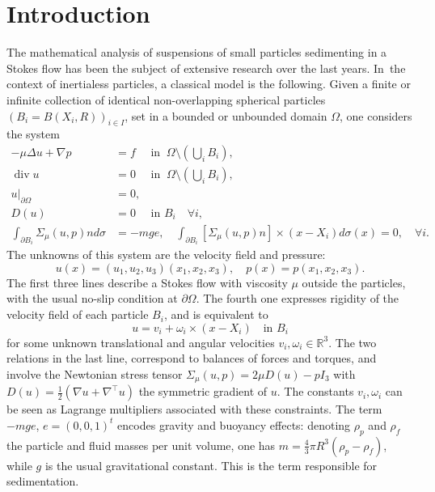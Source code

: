 \documentclass[JEP,XML,SOM,Unicode,NoEqCountersInSection,published]{cedram}
\let\ts\textstyle
\renewcommand{\div}{\operatorname{div}}
\theoremstyle{plain}
\theoremstyle{definition}
\let\pa\partial
\let\na\nabla
\newcommand{\R}{\mathbb{R}}
\begin{document}
\maketitle

\tableofcontents
\mainmatter

\section{Introduction}
The mathematical analysis of suspensions of small particles sedimenting in a Stokes flow has been the subject of extensive research over the last years. In~the context of inertialess particles, a classical model is the following. Given a finite or infinite collection of identical non-overlapping spherical particles $(B_i = B(X_i,R))_{i \in I}$, set in a bounded or unbounded domain $\Omega$, one considers the system
\begin{equation} \label{stokes_equation}
\begin{aligned}
-\mu \Delta u + \na p & = f \quad \text{ in } \: \Omega \setminus(\ts\bigcup_i B_i), \\
\div u & = 0 \quad \text{ in } \: \Omega \setminus(\ts\bigcup_i B_i), \\
u\vert_{\pa \Omega} & = 0, \\
D(u) & = 0 \quad \text{ in } B_i \quad \forall i, \\
\int_{\pa B_i} \Sigma_\mu(u,p) n d \sigma & = -m g e, \quad \int_{\pa B_i} [\Sigma_\mu(u,p) n] \times (x-X_i) d \sigma(x) = 0, \quad \forall i.
\end{aligned}
\end{equation}
The unknowns of this system are the velocity field and pressure:
\[
u(x) = (u_1,u_2,u_3)(x_1,x_2,x_3), \quad p(x) = p(x_1,x_2,x_3).
\]
The first three lines describe a Stokes flow with viscosity $\mu$ outside the particles, with the usual no-slip condition at $\pa \Omega$. The fourth one expresses rigidity of the velocity field of each particle $B_i$, and is equivalent to
\[
u = v_i + \omega_i \times (x-X_i) \quad \text{in } B_i
\]
for some unknown translational and angular velocities $v_i, \omega_i \in \R^3$. The two relations in the last line, correspond to balances of forces and torques, and involve the Newtonian stress tensor $\Sigma_\mu(u,p) = 2\mu D(u) - p I_3$ with $D(u)=\frac{1}{2}(\nabla u + \nabla^\top u)$ the symmetric gradient of $u$. The constants $v_i, \omega_i$ can be seen as Lagrange multipliers associated with these constraints. The term $-mge$, $e = (0,0,1)^t$ encodes gravity and buoyancy effects: denoting $\rho_p$ and $\rho_f$ the particle and fluid masses per unit volume, one has $m = \frac{4}{3} \pi R^3 (\rho_p - \rho_f)$, while $g$ is the usual gravitational constant. This is the term responsible for sedimentation.
\end{document}
